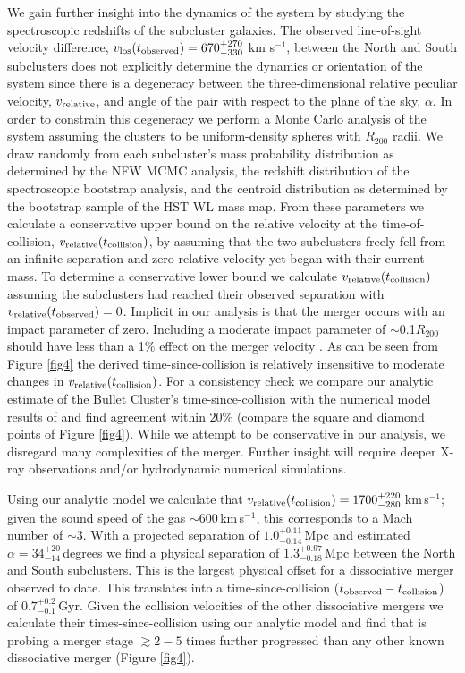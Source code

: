 We gain further insight into the dynamics of the system by studying the spectroscopic redshifts of the subcluster galaxies.
The observed line-of-sight velocity difference, $v_{\rm los}(t_{\rm observed})=670^{+270}_{-330}$ km s$^{-1}$, between the North and South subclusters does not explicitly determine the dynamics or orientation of the system since there is a degeneracy between the three-dimensional relative peculiar velocity, $v_{\rm relative}$, and angle of the pair with respect to the plane of the sky, $\alpha$.
In order to constrain this degeneracy we perform a Monte Carlo analysis of the system assuming the clusters to be uniform-density spheres with $R_{200}$ radii.
We draw randomly from each subcluster's mass probability distribution as determined by the NFW MCMC analysis, the redshift distribution of the spectroscopic bootstrap analysis, and the centroid distribution as determined by the bootstrap sample of the HST WL mass map.
From these parameters we calculate a conservative upper bound on the relative velocity at the time-of-collision, $v_{\rm relative}(t_{\rm collision})$, by assuming that the two subclusters freely fell from an infinite separation and zero relative velocity yet began with their current mass.
To determine a conservative lower bound we calculate $v_{\rm relative}(t_{\rm collision})$  assuming the subclusters had reached their observed separation with $v_{\rm relative}(t_{\rm observed})=0$.
Implicit in our analysis is that the merger occurs with an impact parameter of zero.
Including a moderate impact parameter of $\sim$0.1$R_{200}$ should have less than a 1\% effect on the merger velocity \citep{mast08}.
As can be seen from Figure \ref{fig4} the derived time-since-collision is relatively insensitive to moderate changes in $v_{\rm relative}(t_{\rm collision})$.
For a consistency check we compare our analytic estimate of the Bullet Cluster's time-since-collision with the numerical model results of \citet{spri07} and find agreement within $20\%$ (compare the square and diamond points of Figure \ref{fig4}).
While we attempt to be conservative in our analysis, we disregard many complexities of the merger.  
Further insight will require deeper X-ray observations and/or hydrodynamic numerical simulations.

Using our analytic model we calculate that $v_{\rm relative}(t_{\rm collision})= 1700^{+220}_{-280}$\,km\,s$^{-1}$; given the sound speed of the gas $\sim600$\,km\,s$^{-1}$, this corresponds to a Mach number of $\sim3$.
With a projected separation of $1.0^{+0.11}_{-0.14}$\,Mpc and estimated $\alpha = 34^{+20}_{-14}$\,degrees we find a physical separation of $1.3^{+0.97}_{-0.18}$\,Mpc between the North and South subclusters.
This is the largest physical offset for a dissociative merger observed to date.
This translates into a time-since-collision ($t_{\rm observed}-t_{\rm collision}$) of $0.7^{+0.2}_{-0.1}$\,Gyr.
Given the collision velocities of the other dissociative mergers \citep{brad08,mark05,spri07,mert11} we calculate their times-since-collision using our analytic model and find that  is probing a merger stage $\gtrsim 2-5$ times further progressed than any other known dissociative merger (Figure \ref{fig4}).  


